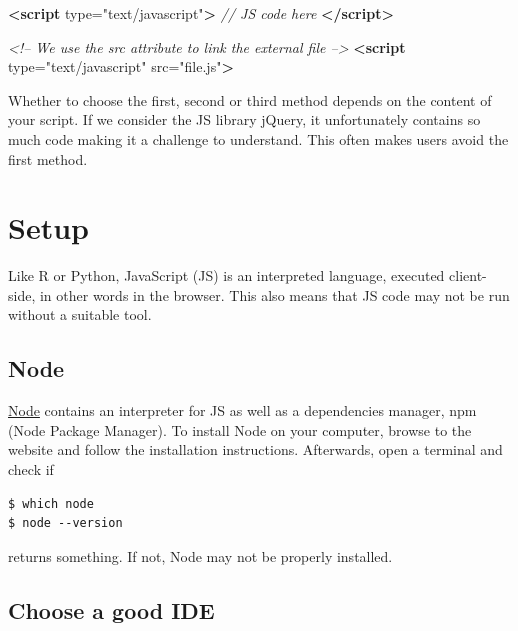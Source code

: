 \documentclass[]{book}
\newenvironment{Shaded}{\begin{snugshade}}{\end{snugshade}}
\newcommand{\CommentTok}[1]{\textcolor[rgb]{0.56,0.35,0.01}{\textit{#1}}}
\newcommand{\KeywordTok}[1]{\textcolor[rgb]{0.13,0.29,0.53}{\textbf{#1}}}
\newcommand{\OtherTok}[1]{\textcolor[rgb]{0.56,0.35,0.01}{#1}}
\newcommand{\StringTok}[1]{\textcolor[rgb]{0.31,0.60,0.02}{#1}}
\begin{document}
\begin{Shaded}
\begin{Highlighting}[]
\KeywordTok{<script}\OtherTok{ type=}\StringTok{"text/javascript"}\KeywordTok{>}
\CommentTok{// JS code here}
\KeywordTok{</script>}
\end{Highlighting}
\end{Shaded}

\begin{Shaded}
\begin{Highlighting}[]
\CommentTok{<!-- We use the src attribute to link the external file -->}
\KeywordTok{<script}\OtherTok{ type=}\StringTok{"text/javascript"}\OtherTok{ src=}\StringTok{"file.js"}\KeywordTok{>}
\end{Highlighting}
\end{Shaded}

Whether to choose the first, second or third method depends on the content of your script. If we consider the JS library jQuery, it unfortunately contains so much code making it a challenge to understand. This often makes users avoid the first method.

\hypertarget{setup}{%
\section{Setup}\label{setup}}

Like R or Python, JavaScript (JS) is an interpreted language, executed client-side, in other words in the browser. This also means that JS code may not be run without a suitable tool.

\hypertarget{node}{%
\subsection{Node}\label{node}}

\href{https://nodejs.org/en/}{Node} contains an interpreter for JS as well as a dependencies manager, npm (Node Package Manager). To install Node on your computer, browse to the website and follow the installation instructions. Afterwards, open a terminal and check if

\begin{verbatim}
$ which node
$ node --version
\end{verbatim}

returns something. If not, Node may not be properly installed.

\hypertarget{choose-a-good-ide}{%
\subsection{Choose a good IDE}\label{choose-a-good-ide}}
\end{document}
